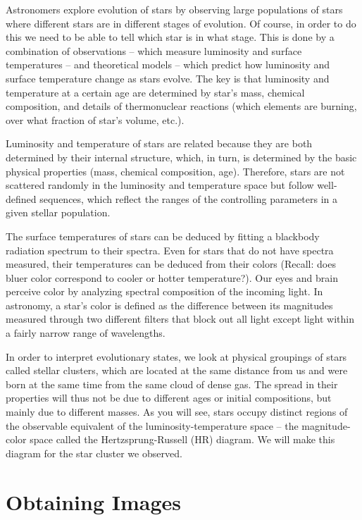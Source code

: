 Astronomers explore evolution of stars by observing large populations of stars where different stars are in different stages of evolution. Of course, in order to do this we need to be able to tell which star is in what stage. This is done by a combination of observations – which measure luminosity and surface temperatures – and theoretical models – which predict how luminosity and surface temperature change as stars evolve. The key is that luminosity and temperature at a certain age are determined by star's mass, chemical composition, and details of thermonuclear reactions (which elements are burning, over what fraction of star's volume, etc.).

Luminosity and temperature of stars are related because they are both determined by their internal structure, which, in turn, is determined by the basic physical properties (mass, chemical composition, age). Therefore, stars are not scattered randomly in the luminosity and temperature space but follow well-defined sequences, which reflect the ranges of the controlling parameters in a given stellar population. 

The surface temperatures of stars can be deduced by fitting a blackbody radiation spectrum to their spectra. Even for stars that do not have spectra measured, their temperatures can be deduced from their colors (Recall: does bluer color correspond to cooler or hotter temperature?). Our eyes and brain perceive color by analyzing spectral composition of the incoming light. In astronomy, a star's color is defined as the difference between its magnitudes measured through two different filters that block out all light except light within a fairly narrow range of wavelengths. 

In order to interpret evolutionary states, we look at physical groupings of stars called stellar clusters, which are located at the same distance from us and were born at the same time from the same cloud of dense gas. The spread in their properties will thus not be due to different ages or initial compositions, but mainly due to different masses. As you will see, stars occupy distinct regions of the observable equivalent of the luminosity-temperature space – the magnitude-color space called the Hertzsprung-Russell (HR) diagram. We will make this diagram for the star cluster we observed.

\section{Obtaining Images}

